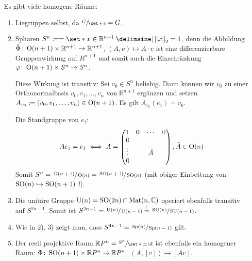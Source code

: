 \begin{beispiel*}
	Es gibt viele homogene Räume:
	\begin{enumerate}[1)]
		\item Liegruppen selbst, da $\sfrac{G}{\set*{e}} =G$.
		\item Sphären $S^n \coloneqq = \set*{x \in \mathbb{R}^{n+1} \given \norm*{x}_2=1}$, denn die Abbildung $\hat{\Phi} \colon \operatorname{O}(n+1) \times \mathbb{R}^{n+1} \to \mathbb{R}^{n+1}$, $(A,v) \mapsto A \cdot v$ ist eine differenzierbare Gruppenwirkung auf $R^{n+1}$ und somit auch die Einschränkung $\varphi \colon \operatorname{O}(n+1) \times S^n \to S^n$.
		
		Diese Wirkung ist transitiv: Sei $v_0 \in S^n$ beliebig.
		Dann können wir $v_0$ zu einer Orthonormalbasis $v_0,v_1, \ldots ,v_n$ von $\mathbb{R}^{n+1}$ ergänzen und setzen $A_{v_0} \coloneqq (v_0,v_1, \ldots , v_n) \in \operatorname{O}(n+1)$.
		Es gilt $A_{v_0}(e_1) = v_0$.
		
		Die Standgruppe von $e_1$:
		\[
			A e_1 = e_1 \iff A = \begin{pmatrix}
				1 & 0 & \cdots & 0 \\
				0 & & & \\
				\vdots & & \tilde{A} & \\
				0 & & & 
			\end{pmatrix}, \tilde{A} \in \operatorname{O}(n)
		\]
		Somit $S^n = \sfrac{\operatorname{O}(n+1)}{\operatorname{O}(n)} = \sfrac{\operatorname{SO}(n+1)}{\operatorname{SO}(n)}$ (mit obiger Einbettung von $\operatorname{SO}(n) \hookrightarrow \operatorname{SO}(n+1)$ !).
		\item Die unitäre Gruppe $\operatorname{U}(n) = \operatorname{SO}(2n) \cap \operatorname{Mat}(n,\mathbb{C})$ operiert ebenfalls transitiv auf $S^{2n-1}$.
		Somit ist $S^{2n-1} = \sfrac{\operatorname{U}(n)}{\operatorname{U}(n-1)} \stackrel{!}{=} \sfrac{\operatorname{SU}(n)}{\operatorname{SU}(n-1)}$.
		\item Wie in 2), 3) zeigt man, dass
		\(
			S^{4n-1} = \sfrac{\operatorname{Sp}(n)}{\operatorname{Sp}(n-1)}
		\) gilt.
		\item Der reell projektive Raum $\mathbb{R}P^n = \sfrac{S^n}{\set*{\pm \id}}$ ist ebenfalls ein homogener Raum: $\Phi \colon \operatorname{SO}(n+1) \times \mathbb{R}P^n \to \mathbb{R}P^n$, $(A,[v]) \mapsto [Av]$.
		

\end{enumerate}
\end{beispiel*}
